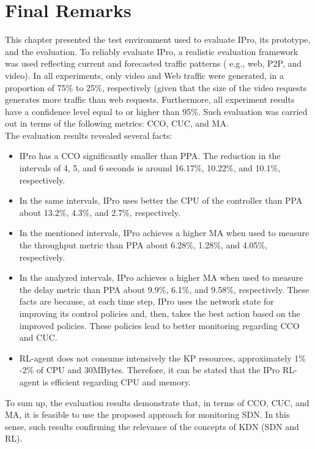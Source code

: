 \section{Final Remarks}
\label{sec:final_remarks_kap5}

This chapter presented the test environment used to evaluate IPro, its prototype, and the evaluation. To reliably evaluate IPro, a realistic evaluation framework was used reflecting current and forecasted traffic patterns ( e.g., web, P2P, and video). In all experiments, only video and Web traffic were generated, in a proportion of 75\% to 25\%, respectively (given that the size of the video requests generates more traffic than web requests. Furthermore, all experiment results have a confidence level equal to or higher than 95\%. Such evaluation was carried out in terms of the following metrics: CCO, CUC, and MA. \\

The evaluation results revealed several facts:
\begin{itemize}
    \item IPro has a CCO significantly smaller than PPA. The reduction in the intervals of 4, 5, and 6 seconds is around 16.17\%, 10.22\%, and 10.1\%, respectively.
    \item In the same intervals, IPro uses better the CPU of the controller than PPA about 13.2\%, 4.3\%, and 2.7\%, respectively.
    \item In the mentioned intervals, IPro achieves a higher MA when used to measure the throughput metric than PPA about 6.28\%, 1.28\%, and 4.05\%, respectively.
    \item In the analyzed intervals, IPro achieves a higher MA when used to measure the delay metric than PPA about 9.9\%, 6.1\%, and 9.58\%, respectively. These facts are because, at each time step, IPro uses the network state for improving its control policies and, then, takes the best action based on the improved policies. These policies lead to better monitoring regarding CCO and CUC.
    \item RL-agent does not consume intensively the KP resources, approximately 1\% -2\% of CPU and 30MBytes. Therefore, it can be stated that the IPro RL-agent is efficient regarding CPU and memory.%
\end{itemize}{}

To sum up, the evaluation results demonstrate that, in terms of CCO, CUC, and MA, it is feasible to use the proposed approach for monitoring SDN. In this sense, such results confirming the relevance of the concepts of KDN (SDN and RL). \\

